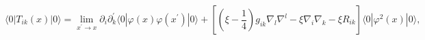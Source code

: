 \begin{equation}
\langle 0|T_{ik}(x)|0\rangle =\lim_{x^{\prime }\rightarrow x}\partial
_{i}\partial _{k}^{\prime }\langle 0|\varphi (x)\varphi (x^{\prime
})|0\rangle +\left[ \left( \xi -\frac{1}{4}\right) g_{ik}\nabla _{l}\nabla
^{l}-\xi \nabla _{i}\nabla _{k}-\xi R_{ik}\right] \langle 0|\varphi
^{2}(x)|0\rangle ,  \label{mvevEMT}
\end{equation}

